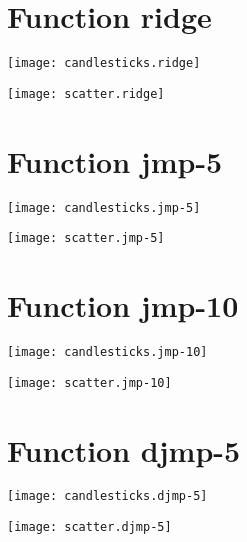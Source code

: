 \section{Function ridge}
\begin{center}

\end{center}
\begin{center}
\texttt{[image: candlesticks.ridge]}
\end{center}
\begin{center}
\texttt{[image: scatter.ridge]}
\end{center}
\begin{center}

\end{center}
\newpage
\section{Function jmp-5}
\begin{center}

\end{center}
\begin{center}
\texttt{[image: candlesticks.jmp-5]}
\end{center}
\begin{center}
\texttt{[image: scatter.jmp-5]}
\end{center}
\begin{center}

\end{center}
\newpage
\section{Function jmp-10}
\begin{center}

\end{center}
\begin{center}
\texttt{[image: candlesticks.jmp-10]}
\end{center}
\begin{center}
\texttt{[image: scatter.jmp-10]}
\end{center}
\begin{center}

\end{center}
\newpage
\section{Function djmp-5}
\begin{center}

\end{center}
\begin{center}
\texttt{[image: candlesticks.djmp-5]}
\end{center}
\begin{center}
\texttt{[image: scatter.djmp-5]}
\end{center}
\begin{center}

\end{center}
\newpage
